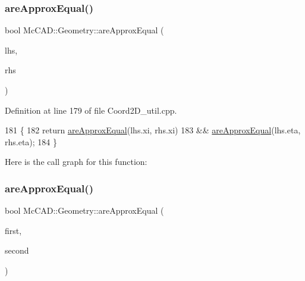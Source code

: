 \subsubsection{\texorpdfstring{are\+Approx\+Equal()}{areApproxEqual()}\hspace{0.1cm}{\footnotesize\ttfamily [3/4]}}
{\footnotesize\ttfamily bool Mc\+C\+A\+D\+::\+Geometry\+::are\+Approx\+Equal (\begin{DoxyParamCaption}\item[{const \hyperlink{classMcCAD_1_1Geometry_1_1Coord2D}{Coord2D} \&}]{lhs,  }\item[{const \hyperlink{classMcCAD_1_1Geometry_1_1Coord2D}{Coord2D} \&}]{rhs }\end{DoxyParamCaption})}



Definition at line 179 of file Coord2\+D\+\_\+util.\+cpp.


\begin{DoxyCode}
181                            \{
182     \textcolor{keywordflow}{return} \hyperlink{namespaceMcCAD_1_1Geometry_acad920c663ce775977ff6dc46b1030af}{areApproxEqual}(lhs.xi, rhs.xi)
183             && \hyperlink{namespaceMcCAD_1_1Geometry_acad920c663ce775977ff6dc46b1030af}{areApproxEqual}(lhs.eta, rhs.eta);
184 \}
\end{DoxyCode}
Here is the call graph for this function\+:
\mbox{\label{namespaceMcCAD_1_1Geometry_a65700a8377f9976917679d72ae40a16a}} 
\subsubsection{\texorpdfstring{are\+Approx\+Equal()}{areApproxEqual()}\hspace{0.1cm}{\footnotesize\ttfamily [4/4]}}
{\footnotesize\ttfamily bool Mc\+C\+A\+D\+::\+Geometry\+::are\+Approx\+Equal (\begin{DoxyParamCaption}\item[{const \hyperlink{classMcCAD_1_1Geometry_1_1Coord3D}{Coord3D} \&}]{first,  }\item[{const \hyperlink{classMcCAD_1_1Geometry_1_1Coord3D}{Coord3D} \&}]{second }\end{DoxyParamCaption})}



